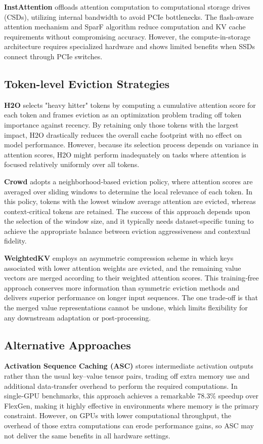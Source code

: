 \documentclass[sigconf,nonacm]{acmart}
\begin{document}
\textbf{InstAttention} \cite{10946721} offloads attention computation to computational storage drives (CSDs), utilizing internal bandwidth to avoid PCIe bottlenecks. The flash-aware attention mechanism and SparF algorithm reduce computation and KV cache requirements without compromising accuracy. However, the compute-in-storage architecture requires specialized hardware and shows limited benefits when SSDs connect through PCIe switches.

\subsection{Token-level Eviction Strategies}
\label{sec:subsection}
\textbf{H2O} \cite{ssdcitation} selects "heavy hitter" tokens by computing a cumulative attention score for each token and frames eviction as an optimization problem trading off token importance against recency. By retaining only those tokens with the largest impact, H2O drastically reduces the overall cache footprint with no effect on model performance. However, because its selection process depends on variance in attention scores, H2O might perform inadequately on tasks where attention is focused relatively uniformly over all tokens.

\textbf{Crowd} \cite{10735473} adopts a neighborhood‐based eviction policy, where attention scores are averaged over sliding windows to determine the local relevance of each token. In this policy, tokens with the lowest window average attention are evicted, whereas context‐critical tokens are retained. The success of this approach depends upon the selection of the window size, and it typically needs dataset‐specific tuning to achieve the appropriate balance between eviction aggressiveness and contextual fidelity.

\textbf{WeightedKV} \cite{10889583} employs an asymmetric compression scheme in which keys associated with lower attention weights are evicted, and the remaining value vectors are merged according to their weighted attention scores. This training‐free approach conserves more information than symmetric eviction methods and delivers superior performance on longer input sequences. The one trade‐off is that the merged value representations cannot be undone, which limits flexibility for any downstream adaptation or post‐processing.
\subsection{Alternative Approaches}
\label{sec:subsection}
\textbf{Activation Sequence Caching (ASC)} \cite{10.1145/3656019.3676945} stores intermediate activation outputs rather than the usual key–value tensor pairs, trading off extra memory use and additional data‐transfer overhead to perform the required computations. In single‐GPU benchmarks, this approach achieves a remarkable 78.3\% speedup over FlexGen, making it highly effective in environments where memory is the primary constraint. However, on GPUs with lower computational throughput, the overhead of those extra computations can erode performance gains, so ASC may not deliver the same benefits in all hardware settings.
\end{document}
